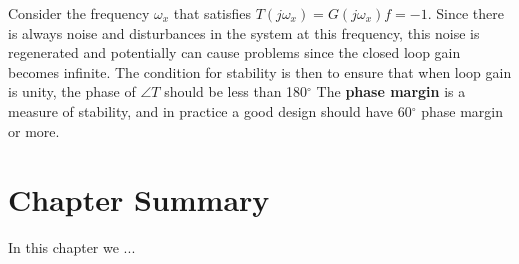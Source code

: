Consider the frequency $\omega_x$ that satisfies $ T(j\omega_x) = G(j{\omega _x})f =  - 1$. Since there is always noise and disturbances in the system at this frequency, this noise is regenerated and potentially can cause problems since the closed loop gain becomes infinite. The condition for stability is then to ensure that when loop gain is unity, the phase of $\angle T$ should be less than 180$^\circ$  The \textbf{phase margin} is a measure of stability, and in practice a good design should have 60$^\circ$ phase margin or more.
%
%
\newpage
\section{Chapter Summary}
In this chapter we ...
